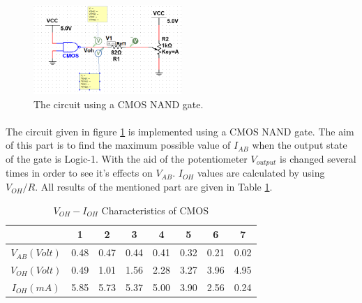 \documentclass[pdftex,12pt,a4paper]{article}
\begin{document}
\begin{flushleft}
 \begin{figure}[h]
    	\centering
    	\includegraphics[width=0.5\textwidth]{part1b-cmos.png}	
    	\caption{The circuit using a CMOS NAND gate.}
    	\label{fig:3-part1b-cmos}
\end{figure}

\paragraph{}The circuit given in figure \ref{fig:3-part1b-cmos} is implemented using a CMOS NAND gate. The aim of this part is to find the maximum possible value of $I_{AB}$ when the output state of the gate is Logic-1. With the aid of the potentiometer $V_{output}$ is changed several times in order to see it's effects on $V_{AB}$. $I_{OH}$ values are calculated by using $V_{OH}/R$. All results of the mentioned part are given in Table \ref{part1b-cmos}.



\begin{table}[h]
\begin{tabular}{c|c|c|c|c|c|c|c|}
                & 1    & 2    & 3    & 4    & 5    & 6    & 7    \\ \hline
$V_{AB} (Volt)$ & 0.48 & 0.47 & 0.44 & 0.41 & 0.32 & 0.21 & 0.02 \\ \hline
$V_{OH} (Volt)$ & 0.49 & 1.01 & 1.56 & 2.28 & 3.27 & 3.96 & 4.95 \\ \hline
$I_{OH} (mA)$   & 5.85 & 5.73 & 5.37 & 5.00 & 3.90 & 2.56 & 0.24
\end{tabular}
\centering
\caption{$V_{OH} - I_{OH}$ Characteristics of CMOS}
\label{part1b-cmos}
\end{table}



\newpage

\end{flushleft}
\end{document}
